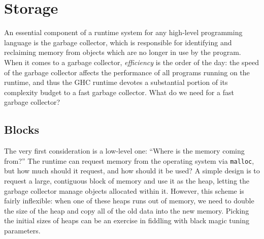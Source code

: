 \section{Storage}

An essential component of a runtime system for any high-level
programming language is the garbage collector, which is responsible for
identifying and reclaiming memory from objects which are no longer in
use by the program.  When it comes to a garbage collector,
\emph{efficiency} is the order of the day: the speed of the garbage
collector affects the performance of all programs running on the
runtime, and thus the GHC runtime devotes a substantial portion of its
complexity budget to a fast garbage collector.  What do we need for
a fast garbage collector?



\subsection{Blocks}

The very first consideration is a low-level one: ``Where is the memory coming
from?''  The runtime can request memory from the operating system via
\verb|malloc|, but how much should it request, and how should it be
used?  A simple design is to request a large, contiguous block of memory
and use it as the heap, letting the garbage collector manage objects allocated
within it.  However, this scheme is fairly inflexible: when one of these heaps
runs out of memory, we need to double the size of the heap and copy all of the
old data into the new memory.  Picking the initial sizes of heaps can be an exercise
in fiddling with black magic tuning parameters.

